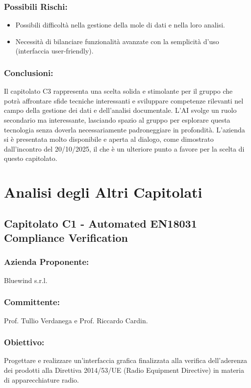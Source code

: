 \documentclass[a4paper,12pt]{article}
\begin{document}
\subsubsection*{Possibili Rischi:}
\begin{itemize}
    \item Possibili difficoltà nella gestione della mole di dati e nella loro analisi.
    \item Necessità di bilanciare funzionalità avanzate con la semplicità d'uso (interfaccia user-friendly).
\end{itemize}

\subsubsection*{Conclusioni:}
Il capitolato C3 rappresenta una scelta solida e stimolante per il gruppo che potrà affrontare sfide tecniche interessanti e sviluppare competenze rilevanti nel campo della gestione dei dati e dell'analisi documentale. 
L'AI svolge un ruolo secondario ma interessante, lasciando spazio al gruppo per esplorare questa tecnologia senza doverla necessariamente padroneggiare in profondità.
L'azienda si è presentata molto disponibile e aperta al dialogo, come dimostrato dall'incontro del 20/10/2025, il che è un ulteriore punto a favore per la scelta di questo capitolato.


\section{Analisi degli Altri Capitolati}

\subsection{Capitolato C1 - Automated EN18031 Compliance Verification}
\subsubsection*{Azienda Proponente:} Bluewind s.r.l.
\subsubsection*{Committente:} Prof. Tullio Verdanega e Prof. Riccardo Cardin.
\subsubsection*{Obiettivo:} Progettare e realizzare un’interfaccia grafica finalizzata alla verifica dell’aderenza dei prodotti alla Direttiva 2014/53/UE (Radio Equipment Directive) in materia di apparecchiature radio. 
\end{document}
